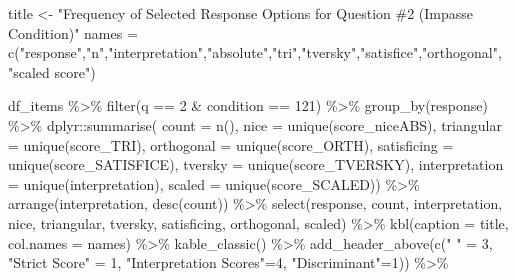\documentclass[
  letterpaper,
  DIV=11,
  numbers=noendperiod]{scrreprt}
\newenvironment{Shaded}{\begin{snugshade}}{\end{snugshade}}
\newcommand{\AttributeTok}[1]{\textcolor[rgb]{0.40,0.45,0.13}{#1}}
\newcommand{\DecValTok}[1]{\textcolor[rgb]{0.68,0.00,0.00}{#1}}
\newcommand{\FunctionTok}[1]{\textcolor[rgb]{0.28,0.35,0.67}{#1}}
\newcommand{\NormalTok}[1]{\textcolor[rgb]{0.00,0.23,0.31}{#1}}
\newcommand{\OtherTok}[1]{\textcolor[rgb]{0.00,0.23,0.31}{#1}}
\newcommand{\SpecialCharTok}[1]{\textcolor[rgb]{0.37,0.37,0.37}{#1}}
\newcommand{\StringTok}[1]{\textcolor[rgb]{0.13,0.47,0.30}{#1}}
\begin{document}
\begin{Shaded}
\begin{Highlighting}[]
\NormalTok{title }\OtherTok{\textless{}{-}} \StringTok{"Frequency of Selected Response Options for Question \#2 (Impasse Condition)"}
\NormalTok{names }\OtherTok{=} \FunctionTok{c}\NormalTok{(}\StringTok{"response"}\NormalTok{,}\StringTok{"n"}\NormalTok{,}\StringTok{"interpretation"}\NormalTok{,}\StringTok{"absolute"}\NormalTok{,}\StringTok{"tri"}\NormalTok{,}\StringTok{"tversky"}\NormalTok{,}\StringTok{"satisfice"}\NormalTok{,}\StringTok{"orthogonal"}\NormalTok{, }\StringTok{"scaled score"}\NormalTok{)}

\NormalTok{df\_items }\SpecialCharTok{\%\textgreater{}\%} \FunctionTok{filter}\NormalTok{(q }\SpecialCharTok{==} \DecValTok{2} \SpecialCharTok{\&}\NormalTok{ condition }\SpecialCharTok{==} \DecValTok{121}\NormalTok{) }\SpecialCharTok{\%\textgreater{}\%} \FunctionTok{group\_by}\NormalTok{(response) }\SpecialCharTok{\%\textgreater{}\%} 
\NormalTok{  dplyr}\SpecialCharTok{::}\FunctionTok{summarise}\NormalTok{( }\AttributeTok{count =} \FunctionTok{n}\NormalTok{(), }
                    \AttributeTok{nice =} \FunctionTok{unique}\NormalTok{(score\_niceABS),}
                    \AttributeTok{triangular =} \FunctionTok{unique}\NormalTok{(score\_TRI), }
                    \AttributeTok{orthogonal =}  \FunctionTok{unique}\NormalTok{(score\_ORTH),}
                    \AttributeTok{satisficing =}  \FunctionTok{unique}\NormalTok{(score\_SATISFICE),}
                    \AttributeTok{tversky =} \FunctionTok{unique}\NormalTok{(score\_TVERSKY),}
                    \AttributeTok{interpretation =} \FunctionTok{unique}\NormalTok{(interpretation),}
                    \AttributeTok{scaled =} \FunctionTok{unique}\NormalTok{(score\_SCALED)) }\SpecialCharTok{\%\textgreater{}\%} 
  \FunctionTok{arrange}\NormalTok{(interpretation, }\FunctionTok{desc}\NormalTok{(count)) }\SpecialCharTok{\%\textgreater{}\%} 
  \FunctionTok{select}\NormalTok{(response, count, interpretation, nice, }
\NormalTok{         triangular, tversky, satisficing, orthogonal, scaled) }\SpecialCharTok{\%\textgreater{}\%} 
  \FunctionTok{kbl}\NormalTok{(}\AttributeTok{caption =}\NormalTok{ title, }\AttributeTok{col.names =}\NormalTok{ names) }\SpecialCharTok{\%\textgreater{}\%}  \FunctionTok{kable\_classic}\NormalTok{() }\SpecialCharTok{\%\textgreater{}\%} 
  \FunctionTok{add\_header\_above}\NormalTok{(}\FunctionTok{c}\NormalTok{(}\StringTok{" "} \OtherTok{=} \DecValTok{3}\NormalTok{, }\StringTok{"Strict Score"} \OtherTok{=} \DecValTok{1}\NormalTok{, }\StringTok{"Interpretation Scores"}\OtherTok{=}\DecValTok{4}\NormalTok{, }\StringTok{"Discriminant"}\OtherTok{=}\DecValTok{1}\NormalTok{)) }\SpecialCharTok{\%\textgreater{}\%}

\end{Highlighting}
\end{Shaded}
\end{document}
